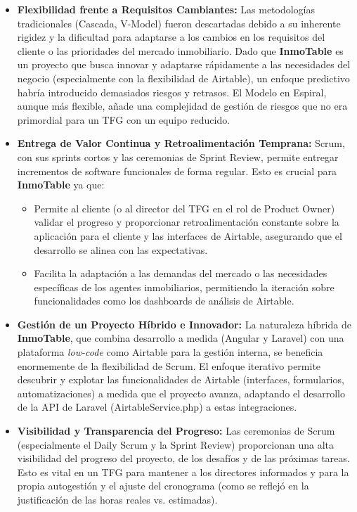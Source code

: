 \begin{itemize}
    \item \textbf{Flexibilidad frente a Requisitos Cambiantes:} Las metodologías tradicionales (Cascada, V-Model) fueron descartadas debido a su inherente rigidez y la dificultad para adaptarse a los cambios en los requisitos del cliente o las prioridades del mercado inmobiliario. Dado que \textbf{InmoTable} es un proyecto que busca innovar y adaptarse rápidamente a las necesidades del negocio (especialmente con la flexibilidad de Airtable), un enfoque predictivo habría introducido demasiados riesgos y retrasos. El Modelo en Espiral, aunque más flexible, añade una complejidad de gestión de riesgos que no era primordial para un TFG con un equipo reducido.
    \item \textbf{Entrega de Valor Continua y Retroalimentación Temprana:} Scrum, con sus sprints cortos y las ceremonias de Sprint Review, permite entregar incrementos de software funcionales de forma regular. Esto es crucial para \textbf{InmoTable} ya que:
    \begin{itemize}
        \item Permite al cliente (o al director del TFG en el rol de Product Owner) validar el progreso y proporcionar retroalimentación constante sobre la aplicación para el cliente y las interfaces de Airtable, asegurando que el desarrollo se alinea con las expectativas.
        \item Facilita la adaptación a las demandas del mercado o las necesidades específicas de los agentes inmobiliarios, permitiendo la iteración sobre funcionalidades como los dashboards de análisis de Airtable.
    \end{itemize}
    \item \textbf{Gestión de un Proyecto Híbrido e Innovador:} La naturaleza híbrida de \textbf{InmoTable}, que combina desarrollo a medida (Angular y Laravel) con una plataforma \textit{low-code} como Airtable para la gestión interna, se beneficia enormemente de la flexibilidad de Scrum. El enfoque iterativo permite descubrir y explotar las funcionalidades de Airtable (interfaces, formularios, automatizaciones) a medida que el proyecto avanza, adaptando el desarrollo de la API de Laravel (AirtableService.php) a estas integraciones.
    \item \textbf{Visibilidad y Transparencia del Progreso:} Las ceremonias de Scrum (especialmente el Daily Scrum y la Sprint Review) proporcionan una alta visibilidad del progreso del proyecto, de los desafíos y de las próximas tareas. Esto es vital en un TFG para mantener a los directores informados y para la propia autogestión y el ajuste del cronograma (como se reflejó en la justificación de las horas reales vs. estimadas).

\end{itemize}

